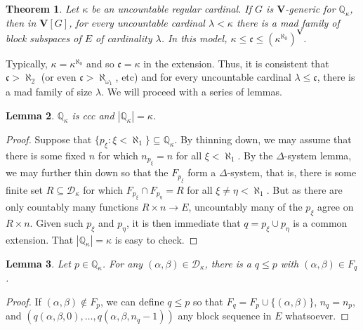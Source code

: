 \documentclass[11pt]{amsart}
\newcommand{\restr}{\upharpoonright}
\newcommand{\Q}{\mathbb{Q}}
\newcommand{\LD}{\mathcal{D}}
\newtheorem{thm}{Theorem}[section]
\newtheorem{lemma}[thm]{Lemma}
\theoremstyle{definition}
\theoremstyle{remark}
\renewcommand{\1}{\mathbf{1}}
\newcommand{\V}{\mathbf{V}}
\newcommand{\cc}{\mathfrak{c}}
\begin{document}
\begin{thm}\label{thm:hechler}
	Let $\kappa$ be an uncountable regular cardinal. If $G$ is $\V$-generic for $\Q_\kappa$, then in $\V[G]$, for every uncountable cardinal $\lambda<\kappa$ there is a mad family of block subspaces of $E$ of cardinality $\lambda$. In this model, $\kappa\leq\cc\leq(\kappa^{\aleph_0})^\V$.
\end{thm}

Typically, $\kappa=\kappa^{\aleph_0}$ and so $\cc=\kappa$ in the extension. Thus, it is consistent that $\cc>\aleph_2$ (or even $\cc>\aleph_{\omega_1}$, etc) and for every uncountable cardinal $\lambda\leq\cc$, there is a mad family of size $\lambda$. We will proceed with a series of lemmas.

\begin{lemma}
	$\Q_\kappa$ is ccc and $|\Q_\kappa|=\kappa$.	
\end{lemma}

\begin{proof}
	Suppose that $\{p_\xi:\xi<\aleph_1\}\subseteq\Q_\kappa$. By thinning down, we may assume that there is some fixed $n$ for which $n_{p_\xi}=n$ for all $\xi<\aleph_1$. By the $\Delta$-system lemma, we may further thin down so that the $F_{p_\xi}$ form a $\Delta$-system, that is, there is some finite set $R\subseteq\LD_\kappa$ for which $F_{p_\xi}\cap F_{p_\eta}=R$ for all $\xi\neq\eta<\aleph_1$. But as there are only countably many functions $R\times n\to E$, uncountably many of the $p_\xi$ agree on $R\times n$. Given such $p_\xi$ and $p_\eta$, it is then immediate that $q=p_\xi\cup p_\eta$ is a common extension. That $|\Q_\kappa|=\kappa$ is easy to check.	
\end{proof}

\begin{lemma}\label{lem:extend_F_p}
	Let $p\in\Q_\kappa$. For any $(\alpha,\beta)\in\LD_\kappa$, there is a $q\leq p$ with $(\alpha,\beta)\in F_q$.
\end{lemma}

\begin{proof}
	If $(\alpha,\beta)\notin F_p$, we can define $q\leq p$ so that $F_q=F_p\cup\{(\alpha,\beta)\}$, $n_q=n_p$, and $(q(\alpha,\beta,0),\ldots,q(\alpha,\beta,n_q-1))$ any block sequence in $E$ whatsoever.%
\end{proof}
\end{document}
